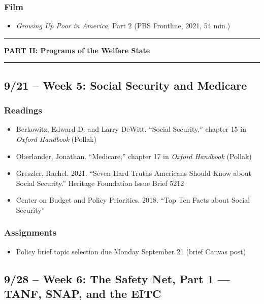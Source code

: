 \documentclass[12pt]{article}
\begin{document}
    \subsubsection*{Film}
        \begin{itemize}
            \item \emph{Growing Up Poor in America}, Part 2 (PBS Frontline, 2021, 54 min.)
        \end{itemize}

\bigskip
\noindent\rule{\textwidth}{0.6pt}
\begin{center}\textbf{PART II: Programs of the Welfare State}\end{center}
\noindent\rule{\textwidth}{0.6pt}

\subsection*{9/21 -- Week 5: Social Security and Medicare}
    \subsubsection*{Readings}
        \begin{itemize}
            \item Berkowitz, Edward D. and Larry DeWitt. ``Social Security,'' chapter 15 in \emph{Oxford Handbook} (Pollak)
            \item Oberlander, Jonathan. ``Medicare,'' chapter 17 in \emph{Oxford Handbook} (Pollak)
            \item Greszler, Rachel. 2021. ``Seven Hard Truths Americans Should Know about Social Security.'' Heritage Foundation Issue Brief 5212
            \item Center on Budget and Policy Priorities. 2018. ``Top Ten Facts about Social Security''
        \end{itemize}
    \subsubsection*{Assignments}
        \begin{itemize}
            \item Policy brief topic selection due Monday September 21 (brief Canvas post)
        \end{itemize}

\subsection*{9/28 -- Week 6: The Safety Net, Part 1 --- TANF, SNAP, and the EITC}
\end{document}

